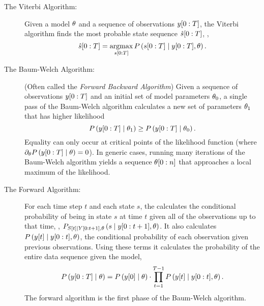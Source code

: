 \begin{description}
\item[The Viterbi Algorithm:]  Given a model
  $\theta$ and a sequence of observations $y[0:T]$, the
  Viterbi algorithm finds the most probable state sequence $\hat
    s[0:T]$, \ie,
  \begin{equation}
    \label{eq:intro-viterbi}
    \hat s[0:T] = \operatorname*{argmax}_{s[0:T]} P
    \left(s[0:T]\mid y[0:T],\theta\right).
  \end{equation}
\item[The Baum-Welch Algorithm:] 
  (Often
  called the \emph{Forward Backward Algorithm}) Given a sequence of
  observations $y[0:T]$ and an initial set of model parameters
  $\theta_0$, a single pass of the Baum-Welch algorithm
  calculates a new set of parameters $\theta_1$ that has higher
  likelihood
  \begin{equation}
    \label{eq:intro-fba}
    P\left( y[0:T]\mid \theta_1 \right) \geq
    P\left( y[0:T]\mid \theta_0 \right).
  \end{equation}
  Equality can only occur at critical points of the likelihood
  function (where $\partial_\theta P\left(
    y[0:T]\mid \theta \right) = 0$).  In generic cases,
running many iterations of the Baum-Welch algorithm yields a sequence
$\theta[0:n]$ that approaches a local maximum of the
likelihood.
\item[The Forward Algorithm:] For each time step $t$ and each state
  $s$, the  calculates the conditional
  probability of being in state $s$ at time $t$ given all of the
  observations up to that time, \ie,
  $P_{{S}{[t]}\mid Y[0:t+1],\theta} \left(s\mid y[0:t+1],
    \theta \right)$. It also calculates
  $P\left({y}{[t]}\mid y[0:t], \theta \right)$, the
  conditional probability of each observation given previous
  observations.  Using these terms it calculates the probability of
  the entire data sequence given the model,
  \begin{equation*}
    P \left(y[0:T]\mid \theta \right) =  P \left({y}{[0]}
      \mid \theta \right) \cdot  \prod_{t=1}^{T-1} P
    \left({y}{[t]}\mid y[0:t], \theta \right).
  \end{equation*}
  The forward algorithm is the first phase of the Baum-Welch algorithm.
\end{description}

